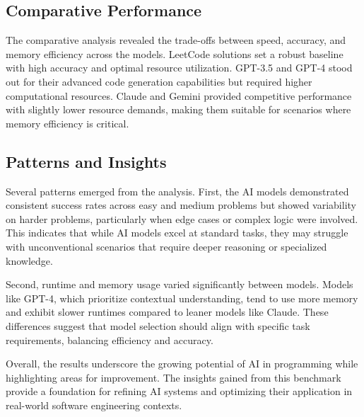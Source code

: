 \subsection{Comparative Performance}

The comparative analysis revealed the trade-offs between speed, accuracy, and memory efficiency across the models. LeetCode solutions set a robust baseline with high accuracy and optimal resource utilization. GPT-3.5 and GPT-4 stood out for their advanced code generation capabilities but required higher computational resources. Claude and Gemini provided competitive performance with slightly lower resource demands, making them suitable for scenarios where memory efficiency is critical.



\subsection{Patterns and Insights}


Several patterns emerged from the analysis. First, the AI models demonstrated consistent success rates across easy and medium problems but showed variability on harder problems, particularly when edge cases or complex logic were involved. This indicates that while AI models excel at standard tasks, they may struggle with unconventional scenarios that require deeper reasoning or specialized knowledge.

Second, runtime and memory usage varied significantly between models. Models like GPT-4, which prioritize contextual understanding, tend to use more memory and exhibit slower runtimes compared to leaner models like Claude. These differences suggest that model selection should align with specific task requirements, balancing efficiency and accuracy.

Overall, the results underscore the growing potential of AI in programming while highlighting areas for improvement. The insights gained from this benchmark provide a foundation for refining AI systems and optimizing their application in real-world software engineering contexts.



















